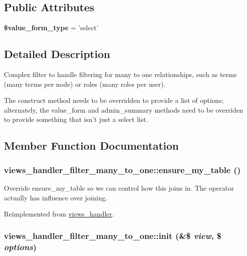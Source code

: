 \subsection*{Public Attributes}
\begin{CompactItemize}
\item 
\hypertarget{classviews__handler__filter__many__to__one_a31ab009988ec4f015588b3dcf8c3b92}{
\textbf{\$value\_\-form\_\-type} = 'select'}
\label{classviews__handler__filter__many__to__one_a31ab009988ec4f015588b3dcf8c3b92}

\end{CompactItemize}


\subsection{Detailed Description}
Complex filter to handle filtering for many to one relationships, such as terms (many terms per node) or roles (many roles per user).

The construct method needs to be overridden to provide a list of options; alternately, the value\_\-form and admin\_\-summary methods need to be overriden to provide something that isn't just a select list. 

\subsection{Member Function Documentation}
\hypertarget{classviews__handler__filter__many__to__one_6ab5d3416cca7a6f5e59584071758673}{
\subsubsection[{ensure\_\-my\_\-table}]{\setlength{\rightskip}{0pt plus 5cm}views\_\-handler\_\-filter\_\-many\_\-to\_\-one::ensure\_\-my\_\-table ()}}
\label{classviews__handler__filter__many__to__one_6ab5d3416cca7a6f5e59584071758673}


Override ensure\_\-my\_\-table so we can control how this joins in. The operator actually has influence over joining. 

Reimplemented from \hyperlink{classviews__handler_947f21ef0f21a77f4d103af4702b3600}{views\_\-handler}.\hypertarget{classviews__handler__filter__many__to__one_8417192dd11eaf273b05cbbc47990cbe}{
\subsubsection[{init}]{\setlength{\rightskip}{0pt plus 5cm}views\_\-handler\_\-filter\_\-many\_\-to\_\-one::init (\&\$ {\em view}, \/  \$ {\em options})}}
\label{classviews__handler__filter__many__to__one_8417192dd11eaf273b05cbbc47990cbe}


